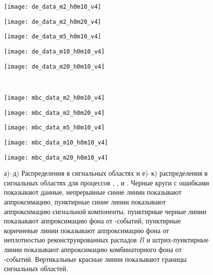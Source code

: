  \begin{figure}[H]
\begin{minipage}[b]{0.195\textwidth}
  \centering
  \texttt{[image: de\_data\_m2\_h0m10\_v4]}
  \subcaption{\detagg}
\end{minipage}
\begin{minipage}[b]{0.195\textwidth}
  \centering
  \texttt{[image: de\_data\_m2\_h0m20\_v4]}
  \subcaption{\detappp}
\end{minipage}
\begin{minipage}[b]{0.195\textwidth}
  \centering
  \texttt{[image: de\_data\_m5\_h0m10\_v4]}
  \subcaption{\detap}
\end{minipage}
\begin{minipage}[b]{0.195\textwidth}
  \centering
  \texttt{[image: de\_data\_m10\_h0m10\_v4]}
  \subcaption{\dstpi}
\end{minipage}
\begin{minipage}[b]{0.195\textwidth}
  \centering
  \texttt{[image: de\_data\_m20\_h0m10\_v4]}
  \subcaption{\dsteta}
\end{minipage}
 \\
\begin{minipage}[b]{0.19\textwidth}
  \centering
  \texttt{[image: mbc\_data\_m2\_h0m10\_v4]}
  \subcaption{\detagg}
\end{minipage}
\begin{minipage}[b]{0.205\textwidth}
  \centering
  \texttt{[image: mbc\_data\_m2\_h0m20\_v4]}
  \subcaption{\detappp}
\end{minipage}
\begin{minipage}[b]{0.19\textwidth}
  \centering
  \texttt{[image: mbc\_data\_m5\_h0m10\_v4]}
  \subcaption{\detap}
\end{minipage}
\begin{minipage}[b]{0.195\textwidth}
  \centering
  \texttt{[image: mbc\_data\_m10\_h0m10\_v4]}
  \subcaption{\dstpi}
\end{minipage}
\begin{minipage}[b]{0.195\textwidth}
  \centering
  \texttt{[image: mbc\_data\_m20\_h0m10\_v4]}
  \subcaption{\dsteta}
\end{minipage}
  \caption{а)--д) Распределения \de в сигнальных областях \mbc и е)--к) распределения \mbc в сигнальных областях \de для процессов \bdeta, \bdetap, \bdstpi и \bdsteta.  Черные круги с ошибками показывают данные, непрерывные синие линии показывают аппроксимацию, пунктирные синие линии показывают аппроксимацию сигнальной компоненты, пунктирные черные линии показывают аппроксимацию фона от \qqbar-событий, пунктирные коричневые линии показывают аппроксимацию фона от неплотностью реконструированных распадов $B$ и штрих-пунктирные линии показывают аппроксимацию комбинаторного фона от \bbbar-событий.  Вертикальные красные линии показывают границы сигнальных областей.}
  \label{fig:de_mbc_others}
 \end{figure}

